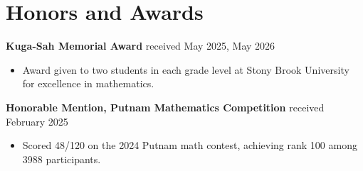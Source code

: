 \documentclass[10pt]{article}
\providecommand{\ii}{\item}
\begin{document}
\vspace{-3mm}\section*{Honors and Awards}
\textbf{Kuga-Sah Memorial Award}
\hfill{}received May 2025, May 2026
\begin{itemize}
    \ii Award given to two students in each grade level
    at Stony Brook University for excellence in mathematics.
\end{itemize}
\textbf{Honorable Mention, Putnam Mathematics Competition}
\hfill{}received February 2025
\begin{itemize}
    \ii Scored 48/120 on the 2024 Putnam math contest, achieving rank 100
    among 3988 participants.
\end{itemize}

%
%
\end{document}
